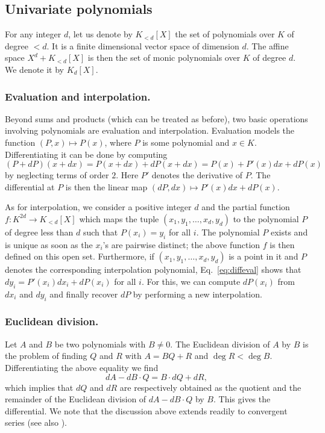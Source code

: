 \documentclass{lms}
\begin{document}
\subsection{Univariate polynomials}
\label{ssec:polynomials}

For any integer $d$, let us denote by $K_{< d}[X]$ the set of 
polynomials over $K$ of degree $< d$. It is a finite dimensional vector 
space of dimension $d$. The affine space $X^d + K_{< d}[X]$ is then 
the set of monic polynomials over $K$ of degree $d$. We denote it by 
$K_d[X]$.

\subsubsection*{Evaluation and interpolation.}

Beyond sums and products (which can be treated as before), two basic 
operations involving polynomials are evaluation and interpolation.
Evaluation models the function $(P,x) \mapsto P(x)$, where
$P$ is some polynomial and $x \in K$. Differentiating
it can be done by computing
\begin{equation}
\label{eq:diffeval}
(P + dP)(x + dx) = P(x + dx) + dP(x + dx) = P(x) + P'(x) dx + dP(x)
\end{equation}
by neglecting terms of order $2$. Here $P'$ denotes the derivative of 
$P$. The differential at $P$ is then the linear map $(dP, dx) \mapsto 
P'(x) dx + dP(x)$.

As for interpolation, we consider a positive integer $d$ and the partial 
function $f : K^{2d} \to K_{< d}[X]$ which maps the tuple $(x_1, y_1, 
\ldots, x_d, y_d)$ to the polynomial $P$ of degree less than $d$ such 
that $P(x_i) = y_i$ for all $i$. The polynomial $P$ exists and is unique 
as soon as the $x_i$'s are pairwise distinct; the above function $f$ is 
then defined on this open set. Furthermore, if $(x_1, y_1, \ldots, x_d, 
y_d)$ is a point in it and $P$ denotes the corresponding interpolation 
polynomial, Eq.~\eqref{eq:diffeval} shows that $d y_i = P'(x_i) dx_i + 
dP(x_i)$ for all $i$. For this, we can compute $dP(x_i)$ from $d x_i$ 
and $d y_i$ and finally recover $dP$ by performing a new interpolation.

\subsubsection*{Euclidean division.}

Let $A$ and $B$ be two polynomials with $B \neq 0$. The Euclidean division of 
$A$ by $B$ is the problem of finding $Q$ and $R$ with $A = BQ + R$ and $\deg R < \deg B$. 
Differentiating the above equality we find
\[
dA - dB \cdot Q = B \cdot dQ + dR,
\]
which implies that $dQ$ and $dR$ are respectively obtained as the 
quotient and the remainder of the Euclidean division of $dA - dB \cdot 
Q$ by $B$. This gives the differential. We note that the discussion 
above extends readily to convergent series (see also 
\cite{caruso-lubicz:14a}).
\end{document}
